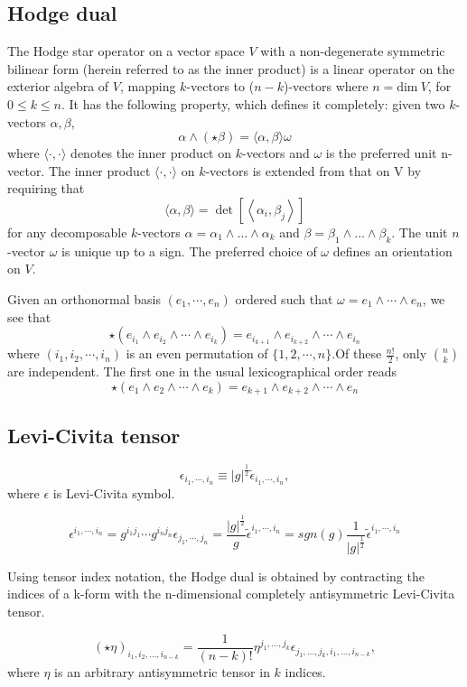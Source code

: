 \subsection{Hodge dual}
\begin{newdef}
The Hodge star operator on a vector space $V$ with a non-degenerate symmetric bilinear form (herein referred to as the inner product) is a linear operator on the exterior algebra of $V$, mapping $k$-vectors to ($n-k$)-vectors where $n = \text{dim} \ V$, for $ 0 \leq k \leq n$. It has the following property, which defines it completely: given two $k$-vectors $\alpha,\beta$,
\[\alpha \wedge (\star \beta )=\langle \alpha ,\beta \rangle \omega\]
where $\langle \cdot ,\cdot \rangle$ denotes the inner product on $k$-vectors and $\omega$ is the preferred unit n-vector.
The inner product $\langle \cdot ,\cdot \rangle$ on $k$-vectors is extended from that on V by requiring that
\[\langle \alpha ,\beta \rangle =\det \left[\left\langle \alpha _{i},\beta _{j}\right\rangle \right]\]
for any decomposable $k$-vectors $\alpha =\alpha _{1}\wedge \dots \wedge \alpha _{k}$ and $\beta =\beta _{1}\wedge \dots \wedge \beta _{k}$. The unit $n$-vector $\omega$ is unique up to a sign. The preferred choice of $\omega$ defines an orientation on $V$.
\end{newdef}
\noindent
Given an orthonormal basis $(e_{1},\cdots ,e_{n})$ ordered such that $\omega =e_{1}\wedge \cdots \wedge e_{n}$, we see that
\[\star (e_{i_{1}}\wedge e_{i_{2}}\wedge \cdots \wedge e_{i_{k}})=e_{i_{k+1}}\wedge e_{i_{k+2}}\wedge \cdots \wedge e_{i_{n}}\]
where $(i_{1},i_{2},\cdots ,i_{n})$ is an even permutation of $\{1,2,\cdots,n\}$.Of these $\frac{n!}{2}$, only $n \choose k$ are independent. The first one in the usual lexicographical order reads
\[\star (e_{1}\wedge e_{2}\wedge \cdots \wedge e_{k})=e_{k+1}\wedge e_{k+2}\wedge \cdots \wedge e_{n}\]

\subsection{Levi-Civita tensor}
\begin{newdef}
\[\epsilon_{i_1,\cdots,i_n} \equiv |g|^{\frac{1}{2}} \tilde{\epsilon}_{i_1,\cdots,i_n} ,\]
where $\epsilon$ is Levi-Civita symbol.
\end{newdef} 
\begin{newprop}
\[\epsilon^{i_1,\cdots,i_n} = g^{i_1j_1} \cdots g^{i_nj_n} \epsilon_{j_1,\cdots,j_n} = \frac{|g|^{\frac{1}{2}}}{g} \tilde{\epsilon}^{i_1,\cdots,i_n} = sgn(g) \frac{1}{|g|^{\frac{1}{2}}} \tilde{\epsilon}^{i_1,\cdots,i_n}\]
\end{newprop}
\noindent
Using tensor index notation, the Hodge dual is obtained by contracting the indices of a k-form with the n-dimensional completely antisymmetric Levi-Civita tensor.
\begin{newprop}
\[(\star \eta )_{i_{1},i_{2},\ldots ,i_{n-k}}={\frac {1}{(n-k)!}}\eta ^{j_{1},\ldots ,j_{k}} \epsilon _{j_{1},\ldots ,j_{k},i_{1},\ldots ,i_{n-k}},\]
where $\eta$ is an arbitrary antisymmetric tensor in $k$ indices. 
\end{newprop}

